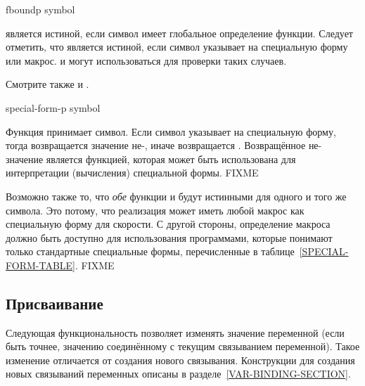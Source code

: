 \begin{defun}[Function]
fboundp symbol

 является истиной, если символ имеет глобальное определение
функции.
Следует отметить, что  является истиной, если символ указывает на
специальную форму или макрос.  и  могут
использоваться для проверки таких случаев.

Смотрите также  и .
\end{defun}

\begin{defun}[Function]
special-form-p symbol

Функция  принимает символ. Если символ указывает на
специальную форму, тогда возвращается значение не-{\false}, иначе возвращается {\false}.
Возвращённое не-{\nil} значение является функцией,
которая может быть использована для интерпретации (вычисления) специальной
формы. FIXME

Возможно также то, что \emph{обе} функции  и
 будут истинными для одного и того же символа. Это потому,
что реализация может иметь любой макрос как специальную форму для скорости.
С другой стороны, определение макроса должно быть доступно для использования
программами, которые понимают только стандартные специальные формы,
перечисленные в таблице~\ref{SPECIAL-FORM-TABLE}. FIXME
\end{defun}

\subsection{Присваивание}

Следующая функциональность позволяет изменять значение переменной (если быть
точнее, значению соединённому с текущим связыванием переменной).
Такое изменение отличается от создания нового связывания.
Конструкции для создания новых связываний переменных описаны в
разделе~\ref{VAR-BINDING-SECTION}.

